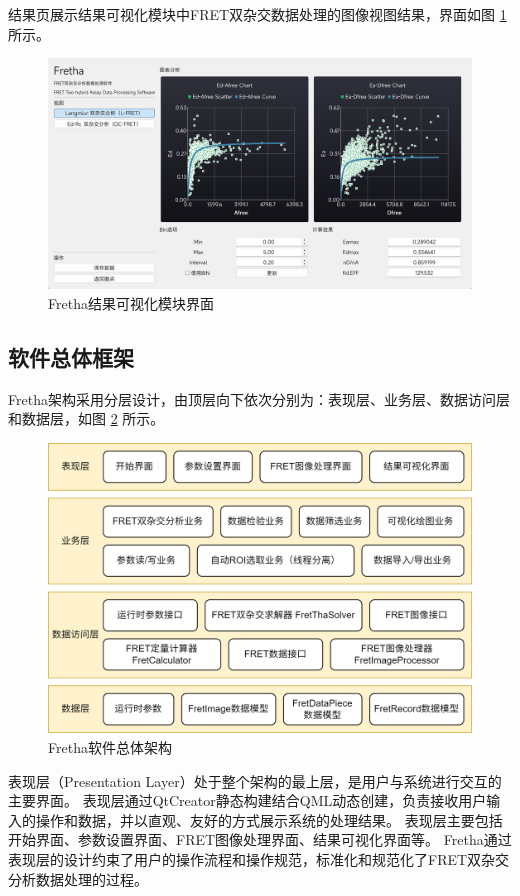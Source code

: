 结果页展示结果可视化模块中FRET双杂交数据处理的图像视图结果，界面如图 \ref{fig:Fretha结果可视化模块界面} 所示。
\begin{figure}[hbtp]
  \centering
  \includegraphics[width=0.9\linewidth]{../figures/2/2_结果可视化.png}
  \caption{Fretha结果可视化模块界面}
  \label{fig:Fretha结果可视化模块界面}
\end{figure}

\subsection{软件总体框架}

Fretha架构采用分层设计，由顶层向下依次分别为：表现层、业务层、数据访问层和数据层，如图 \ref{fig:fretha_arch} 所示。

\begin{figure}[hbtp]
    \centering
    \includegraphics[width=0.9\linewidth]{../figures/2/2_Fretha架构.png}
    \caption{Fretha软件总体架构}
    \label{fig:fretha_arch}
\end{figure}

表现层（Presentation Layer）处于整个架构的最上层，是用户与系统进行交互的主要界面。
表现层通过QtCreator静态构建结合QML动态创建，负责接收用户输入的操作和数据，并以直观、友好的方式展示系统的处理结果。
表现层主要包括开始界面、参数设置界面、FRET图像处理界面、结果可视化界面等。
Fretha通过表现层的设计约束了用户的操作流程和操作规范，标准化和规范化了FRET双杂交分析数据处理的过程。

